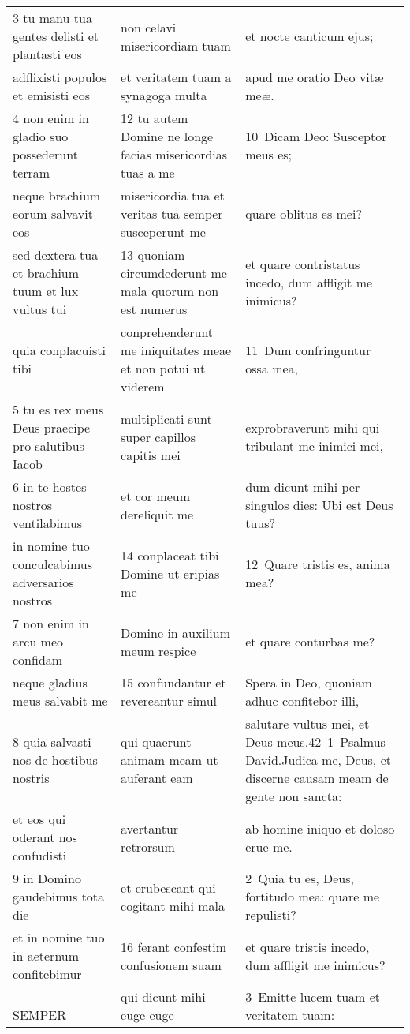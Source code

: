 \documentclass{article}
\begin{document}
\begin{longtable}{@{}p{}p{}p{}@{}}
3 tu manu tua gentes delisti et plantasti eos	&	non celavi misericordiam tuam	&	et nocte canticum ejus;	\\
adflixisti populos et emisisti eos	&	et veritatem tuam a synagoga multa	&	apud me oratio Deo vitæ meæ.	\\
4 non enim in gladio suo possederunt terram	&	12 tu autem Domine ne longe facias misericordias tuas a me	&	10 Dicam Deo: Susceptor meus es;	\\
neque brachium eorum salvavit eos	&	misericordia tua et veritas tua semper susceperunt me	&	quare oblitus es mei?	\\
sed dextera tua et brachium tuum et lux vultus tui	&	13 quoniam circumdederunt me mala quorum non est numerus	&	et quare contristatus incedo, dum affligit me inimicus?	\\
quia conplacuisti tibi	&	conprehenderunt me iniquitates meae et non potui ut viderem	&	11 Dum confringuntur ossa mea,	\\
5 tu es rex meus Deus praecipe pro salutibus Iacob	&	multiplicati sunt super capillos capitis mei	&	exprobraverunt mihi qui tribulant me inimici mei,	\\
6 in te hostes nostros ventilabimus	&	et cor meum dereliquit me	&	dum dicunt mihi per singulos dies: Ubi est Deus tuus?	\\
in nomine tuo conculcabimus adversarios nostros	&	14 conplaceat tibi Domine ut eripias me	&	12 Quare tristis es, anima mea?	\\
7 non enim in arcu meo confidam	&	Domine in auxilium meum respice	&	et quare conturbas me?	\\
neque gladius meus salvabit me	&	15 confundantur et revereantur simul	&	Spera in Deo, quoniam adhuc confitebor illi,	\\
8 quia salvasti nos de hostibus nostris	&	qui quaerunt animam meam ut auferant eam	&	salutare vultus mei, et Deus meus.42 1 Psalmus David.Judica me, Deus, et discerne causam meam de gente non sancta:	\\
et eos qui oderant nos confudisti	&	avertantur retrorsum	&	ab homine iniquo et doloso erue me.	\\
9 in Domino gaudebimus tota die	&	et erubescant qui cogitant mihi mala	&	2 Quia tu es, Deus, fortitudo mea: quare me repulisti?	\\
et in nomine tuo in aeternum confitebimur	&	16 ferant confestim confusionem suam	&	et quare tristis incedo, dum affligit me inimicus?	\\
    SEMPER	&	qui dicunt mihi euge euge	&	3 Emitte lucem tuam et veritatem tuam:	\\

\end{longtable}
\end{document}
